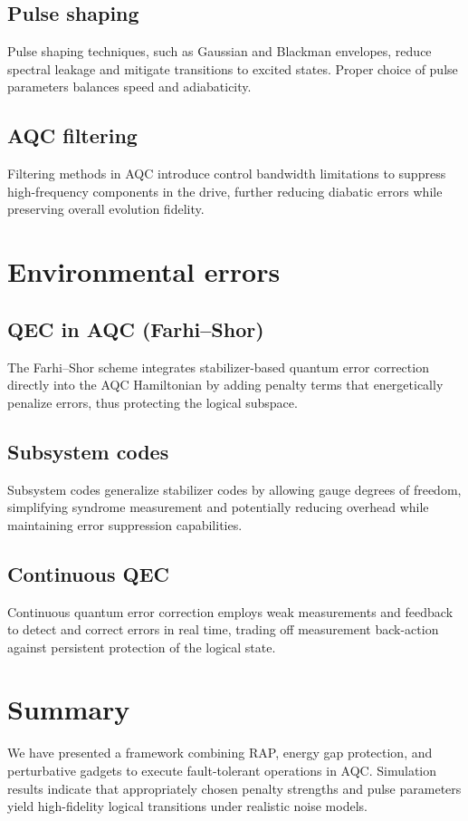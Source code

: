 \documentclass[reprint, amsmath,amssymb,nofootinbib, aps,superscriptaddress,longbibliography]{revtex4-1}
\begin{document}
\subsection{Pulse shaping}
Pulse shaping techniques, such as Gaussian and Blackman envelopes, reduce spectral leakage and mitigate transitions to excited states. Proper choice of pulse parameters balances speed and adiabaticity.

\subsection{AQC filtering}
Filtering methods in AQC introduce control bandwidth limitations to suppress high-frequency components in the drive, further reducing diabatic errors while preserving overall evolution fidelity.

\section{Environmental errors}
\subsection{QEC in AQC (Farhi–Shor)}
The Farhi–Shor scheme integrates stabilizer-based quantum error correction directly into the AQC Hamiltonian by adding penalty terms that energetically penalize errors, thus protecting the logical subspace.

\subsection{Subsystem codes}
Subsystem codes generalize stabilizer codes by allowing gauge degrees of freedom, simplifying syndrome measurement and potentially reducing overhead while maintaining error suppression capabilities.

\subsection{Continuous QEC}
Continuous quantum error correction employs weak measurements and feedback to detect and correct errors in real time, trading off measurement back-action against persistent protection of the logical state.

\section{Summary}
We have presented a framework combining RAP, energy gap protection, and perturbative gadgets to execute fault-tolerant operations in AQC. Simulation results indicate that appropriately chosen penalty strengths and pulse parameters yield high-fidelity logical transitions under realistic noise models.
\end{document}
